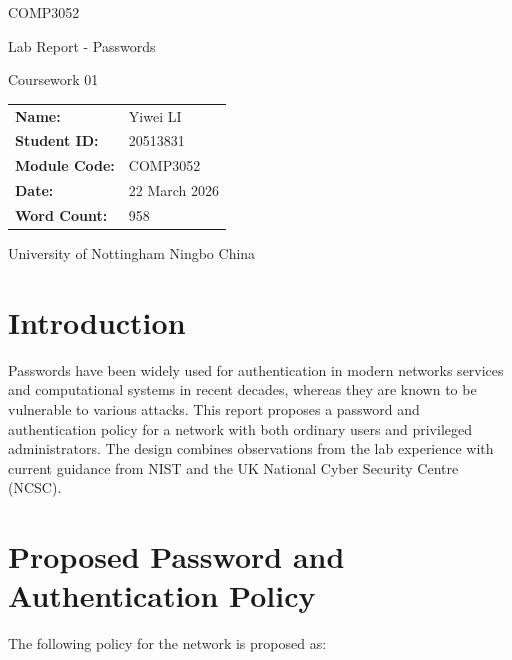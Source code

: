 \documentclass[12pt,a4paper]{article}
\newcommand{\studentname}{Yiwei LI}
\newcommand{\studentid}{20513831}
\newcommand{\modulecode}{COMP3052}
\newcommand{\reporttitle}{Lab Report - Passwords}
\newcommand{\submissiondate}{22 March 2026}
\newcommand{\reportwordcount}{958}
\begin{document}
\hypersetup{pageanchor=false}
\begin{titlepage}
	\centering
	\vspace*{2.4cm}
	{\Large \modulecode \par}
	\vspace{0.7cm}
	{\huge \reporttitle \par}
	\vspace{1.4cm}
	{\large Coursework 01 \par}
	\vfill
		\begin{tabular}{>{\bfseries}p{4.2cm}p{8cm}}
			Name: & \studentname \\
			Student ID: & \studentid \\
			Module Code: & \modulecode \\
			Date: & \submissiondate \\
			Word Count: & \reportwordcount \\
		\end{tabular}
	\vfill
	{\large University of Nottingham Ningbo China \par}
\end{titlepage}
\clearpage
\hypersetup{pageanchor=true}

\section{Introduction}
Passwords have been widely used for authentication in modern networks services and computational systems in recent decades, whereas they are known to be vulnerable to various attacks. This report proposes a password and authentication policy for a network with both ordinary users and privileged administrators. The design combines
observations from the lab experience with current guidance from NIST and the UK National Cyber Security
Centre (NCSC).

\section{Proposed Password and Authentication Policy}
The following policy for the network is proposed as:
\end{document}
